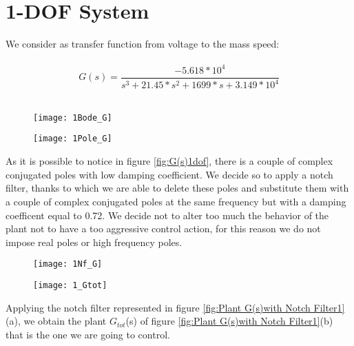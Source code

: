 \section{1-DOF System}
We consider as transfer function from voltage to the mass speed:\\
\\
\[	
G(s)=
\frac{-5.618*10^{4}}{{s^3+21.45*s^{2}}+1699*s+3.149*10^{4}}
\]
\\


\begin{figure*}[h]
	\centering
	\begin{subfigure}{0.4\columnwidth}
		\texttt{[image: 1Bode\_G]}
	\end{subfigure}
	\begin{subfigure}{0.4\columnwidth}
		\texttt{[image: 1Pole\_G]}
	\end{subfigure}
	\caption{G(s)}
	\label{fig:G(s)1dof}
\end{figure*}

As it is possible to notice in figure \ref{fig:G(s)1dof}, there is a couple of complex conjugated poles with low damping coefficient. We decide so to apply a notch filter, thanks to which we are able to delete these poles and substitute them with a couple of complex conjugated poles at the same frequency but with a damping coefficent equal to 0.72. We decide not to alter too much the behavior of the plant not to have a too aggressive control action, for this reason we do not impose real poles or high frequency poles.

\begin{figure*}[h]
	\centering
	\begin{subfigure}{0.35\columnwidth}
		\texttt{[image: 1Nf\_G]}
	\end{subfigure}
	\begin{subfigure}{0.35\columnwidth}
		\texttt{[image: 1\_Gtot]}
	\end{subfigure}
	\caption{Plant G(s) with Notch Filter Nf(s): $G_{tot}$(s)}
	\label{fig:Plant G(s)with Notch Filter1}
\end{figure*}


Applying the notch filter represented in figure \ref{fig:Plant G(s)with Notch Filter1}(a), we obtain the plant $G_{tot}$(s) of figure \ref{fig:Plant G(s)with Notch Filter1}(b) that is the one we are going to control.



